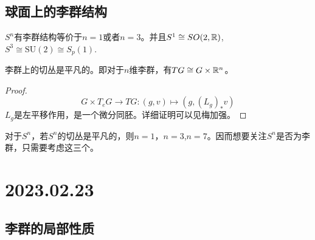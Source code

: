 \section{球面上的李群结构}
$S^n$有李群结构等价于$n=1$或者$n=3$。并且$S^1 \cong SO(2,\mathbb{R})$,$S^3 \cong \mathrm{SU}(2) \cong S_p(1)$.

\begin{proposition}
    李群上的切丛是平凡的。即对于$n$维李群，有$TG \cong G \times \mathbb{R}^n$。
\end{proposition}
\begin{proof}
    $$
    G\times T_e G \to TG:(g,v)\mapsto (g,(L_g)_* v)
    $$
    $L_g$是左平移作用，是一个微分同胚。详细证明可以见梅加强。
\end{proof}

对于$S^n$，若$S^n$的切丛是平凡的，则$n=1$，$n=3$,$n=7$。因而想要关注$S^n$是否为李群，只需要考虑这三个。

\chapter{2023.02.23}
\section{李群的局部性质}
